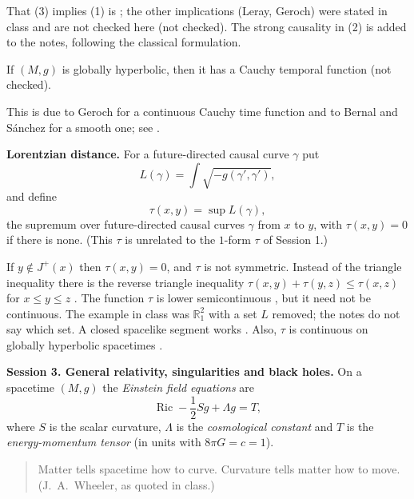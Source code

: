 \noindent
That (3) implies (1) is
\cite[Corollary 14.39]{oneill}; the other
implications (Leray, Geroch) were stated
in class and are not checked here (not
checked). The strong causality in (2) is
added to the notes, following the classical
formulation.

\begin{theorem}
\label{theorem-solis-cauchy-temporal}
If $(M,g)$ is globally hyperbolic, then
it has a Cauchy temporal function (not
checked).
\end{theorem}

\noindent
This is due to Geroch for a continuous
Cauchy time function and to Bernal and
Sánchez for a smooth one; see
\cite{minguzzi2019causality}.

\medskip\noindent
{\bf Lorentzian distance.}
For a future-directed causal curve
$\gamma$ put
$$
L(\gamma)=\int\sqrt{-g(\gamma',\gamma')},
$$
and define
$$
\tau(x,y)=\sup L(\gamma),
$$
the supremum over future-directed causal
curves $\gamma$ from $x$ to $y$, with
$\tau(x,y)=0$ if there is none. (This
$\tau$ is unrelated to the $1$-form $\tau$
of Session 1.)

\begin{remark}
\label{remark-solis-lorentzian-distance}
If $y\notin J^+(x)$ then $\tau(x,y)=0$,
and $\tau$ is not symmetric. Instead of
the triangle inequality there is the
reverse triangle inequality
$\tau(x,y)+\tau(y,z)\leq\tau(x,z)$ for
$x\leq y\leq z$
\cite[Lemma 14.16]{oneill}. The function
$\tau$ is lower semicontinuous
\cite[Lemma 14.17]{oneill}, but it need
not be continuous. The example in class
was $\mathbb{R}^2_1$ with a set $L$
removed; the notes do not say which set.
A closed spacelike segment works
\cite[Example 14.18]{oneill}. Also,
$\tau$ is continuous on globally
hyperbolic spacetimes
\cite[Lemma 14.21]{oneill}.
\end{remark}

\medskip\noindent
{\bf Session 3. General relativity,
singularities and black holes.}
On a spacetime $(M,g)$ the \emph{Einstein
field equations} are
$$
\operatorname{Ric}-\frac{1}{2}Sg
+\Lambda g=T,
$$
where $S$ is the scalar curvature,
$\Lambda$ is the \emph{cosmological
constant} and $T$ is the
\emph{energy-momentum tensor} (in units
with $8\pi G=c=1$).

\begin{quote}
Matter tells spacetime how to curve.
Curvature tells matter how to move.
\hfill (J.~A.~Wheeler, as quoted in
class.)
\end{quote}

